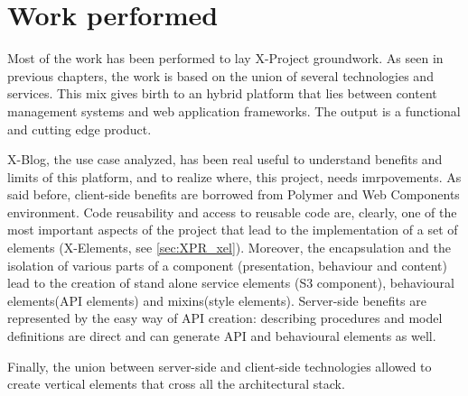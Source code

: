 \section{Work performed}
\label{sec:conclusions_work_performed}

Most of the work has been performed to lay X-Project groundwork. As seen in previous chapters, the work is based on the union of several technologies and services. This mix gives birth to an hybrid platform that lies between content management systems and web application frameworks.
The output is a functional and cutting edge product.

X-Blog, the use case analyzed, has been real useful to understand benefits and limits of this platform, and to realize where, this project, needs imrpovements.
As said before, client-side benefits are borrowed from Polymer and Web Components environment. Code reusability and access to reusable code are, clearly, one of the most important aspects of the project that lead to the implementation of a set of elements (X-Elements, see \ref{sec:XPR_xel}).
Moreover, the encapsulation and the isolation of various parts of a component (presentation, behaviour and content) lead to the creation of stand alone service elements (S3 component), behavioural elements(API elements) and mixins(style elements).
Server-side benefits are represented by the easy way of API creation: describing procedures and model definitions are direct and can generate API and behavioural elements as well. 

Finally, the union between server-side and client-side technologies allowed to create vertical elements that cross all the architectural stack.